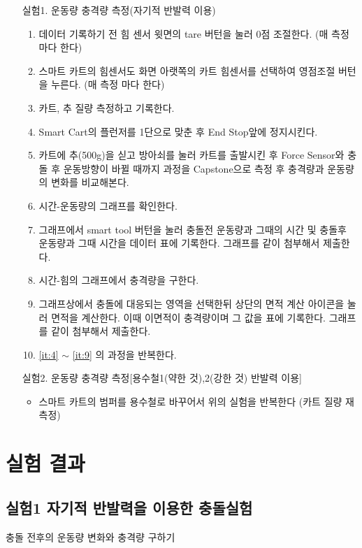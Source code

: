 \documentclass[12pt,a4paper]{article}
\begin{document}
\begin{itemize}
    \item [실험1.] 운동량 충격량 측정(자기적 반발력 이용)
        \begin{enumerate}
            \item 데이터 기록하기 전 힘 센서 윗면의 tare 버턴을 눌러 0점 조절한다.
                (매 측정 마다 한다)
            \item 스마트 카트의 힘센서도 화면 아랫쪽의 카트 힘센서를 선택하여
                영점조절 버턴을 누른다. (매 측정 마다 한다)
            \item 카트, 추 질량 측정하고 기록한다.
            \item {\label{it:4} Smart Cart의 플런저를 1단으로 맞춘 후
                End Stop앞에 정지시킨다.}
            \item 카트에 추(500g)을 싣고 방아쇠를 눌러 카트를
                출발시킨 후 Force Sensor와 충돌 후 운동방향이 바뀔 때까지 과정을
                Capstone으로 측정 후 충격량과 운동량의 변화를 비교해본다.
            \item 시간-운동량의 그래프를 확인한다.
            \item 그래프에서 smart tool 버턴을 눌러 충돌전 운동량과 그때의 시간 및
                충돌후 운동량과 그때 시간을 데이터 표에 기록한다. 그래프를 같이
                첨부해서 제출한다.
            \item 시간-힘의 그래프에서 충격량을 구한다.
            \item {\label{it:9} 그래프상에서 충돌에 대응되는 영역을 선택한뒤
                상단의 면적 계산 아이콘을 눌러 면적을 계산한다. 이때 이면적이
                충격량이며 그 값을 표에 기록한다. 그래프를 같이 첨부해서 제출한다.}
            \item {\ref{it:4} $\sim$ \ref{it:9} 의 과정을 반복한다.}
        \end{enumerate}
    \item [실험2.] 운동량 충격량 측정[용수철1(약한 것),2(강한 것) 반발력 이용]
        \begin{itemize}
            \item 스마트 카트의 범퍼를 용수철로 바꾸어서 위의 실험을 반복한다
                (카트 질량 재측정)
        \end{itemize}
\end{itemize}
\clearpage
\section{실험 결과}
\subsection{실험1 자기적 반발력을 이용한 충돌실험}
충돌 전후의 운동량 변화와 충격량 구하기
\end{document}
